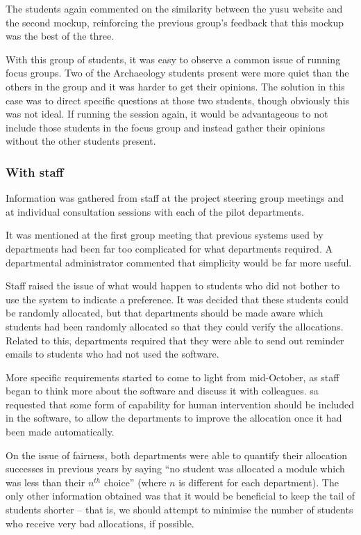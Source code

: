 The students again commented on the similarity between the \gls{yusu} website
and the second mockup, reinforcing the previous group's feedback that this
mockup was the best of the three.

With this group of students, it was easy to observe a common issue of running
focus groups. Two of the Archaeology students present were more quiet than the
others in the group and it was harder to get their opinions. The solution in
this case was to direct specific questions at those two students, though
obviously this was not ideal. If running the session again, it would be
advantageous to not include those students in the focus group and instead
gather their opinions without the other students present.

\subsubsection{With staff}

Information was gathered from staff at the project steering group meetings and
at individual consultation sessions with each of the pilot departments.

It was mentioned at the first group meeting that previous systems used by
departments had been far too complicated for what departments required. A
departmental administrator commented that simplicity would be far more useful.

Staff raised the issue of what would happen to students who did not bother to
use the system to indicate a preference. It was decided that these students
could be randomly allocated, but that departments should be made aware which
students had been randomly allocated so that they could verify the
allocations. Related to this, departments required that they were able to send
out reminder emails to students who had not used the software.

More specific requirements started to come to light from mid-October, as staff
began to think more about the software and discuss it with colleagues.
\gls{sa} requested that some form of capability for human intervention should
be included in the software, to allow the departments to improve the allocation
once it had been made automatically.

On the issue of fairness, both departments were able to quantify their
allocation successes in previous years by saying ``no student was allocated a
module which was less than their $n^{th}$ choice'' (where $n$ is different for
each department). The only other information obtained was that it would be
beneficial to keep the tail of students shorter -- that is, we should attempt
to minimise the number of students who receive very bad allocations, if
possible.

